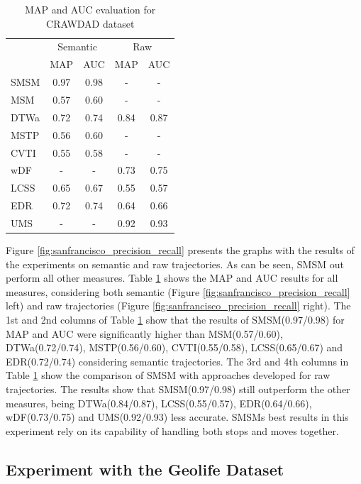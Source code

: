 \documentclass[12pt]{article}
\begin{document}
\begin{table}[h]
\scriptsize
  \centering
  \begin{tabular}{|l|c|c|c|c|}
  	\hline
 & \multicolumn{2}{c}{Semantic} & \multicolumn{2}{|c|}{Raw} \\
 	\cline{2-5}
 & MAP & AUC & MAP & AUC \\
  	\hline
SMSM & 0.97 & 0.98& - & -\\
MSM & 0.57 & 0.60 & - & -\\
DTWa & 0.72 & 0.74 & 0.84 & 0.87\\
MSTP & 0.56 & 0.60 & - & -\\
CVTI & 0.55 & 0.58 & - & -\\
 wDF & - & - & 0.73 & 0.75\\
LCSS & 0.65 & 0.67 & 0.55 & 0.57\\
 EDR & 0.72 & 0.74 & 0.64 & 0.66\\
UMS & - & - & 0.92 & 0.93 \\
    \hline
  \end{tabular}
  \caption{MAP and AUC evaluation for CRAWDAD dataset}
  \label{tab:sanfrancisco_measures_map_auc}
\end{table}

Figure {\ref{fig:sanfrancisco_precision_recall}} presents the graphs with the results of the experiments on semantic and raw trajectories. As can be seen, SMSM out perform all other measures. Table {\ref{tab:sanfrancisco_measures_map_auc}} shows the MAP and AUC results for all measures, considering both semantic (Figure \ref{fig:sanfrancisco_precision_recall} left) and raw trajectories (Figure \ref{fig:sanfrancisco_precision_recall} right). The 1st and 2nd columns of Table {\ref{tab:sanfrancisco_measures_map_auc}} show that the results of SMSM(0.97/0.98) for MAP and AUC were significantly higher than MSM(0.57/0.60), DTWa(0.72/0.74), MSTP(0.56/0.60), CVTI(0.55/0.58), LCSS(0.65/0.67) and EDR(0.72/0.74) considering semantic trajectories. The 3rd and 4th columns in Table {\ref{tab:sanfrancisco_measures_map_auc}} show the comparison of SMSM with approaches developed for	 raw trajectories. The results show that SMSM(0.97/0.98) still outperform the other measures, being DTWa(0.84/0.87), LCSS(0.55/0.57), EDR(0.64/0.66), wDF(0.73/0.75) and UMS(0.92/0.93) less accurate. SMSMs best results in this experiment rely on its capability of handling both stops and moves together.

\subsection{Experiment with the Geolife Dataset}\label{sec:geolife}
\end{document}
